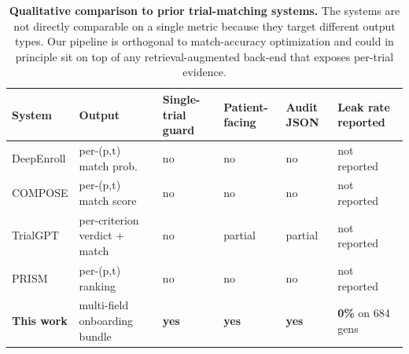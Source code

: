 \documentclass[11pt]{article}
\begin{document}
\begin{table}[!htbp]
\centering
\caption{\textbf{Qualitative comparison to prior trial-matching systems.} The systems are not directly comparable on a single metric because they target different output types. Our pipeline is orthogonal to match-accuracy optimization and could in principle sit on top of any retrieval-augmented back-end that exposes per-trial evidence.}
\label{tab:prior_systems}
\small
\setlength{\tabcolsep}{4pt}
\begin{tabularx}{\linewidth}{l X X X X X}
\toprule
System & Output & Single-trial guard & Patient-facing & Audit JSON & Leak rate reported \\
\midrule
DeepEnroll \citep{zhang2020deepenroll}  & per-(p,t) match prob.  & no  & no  & no  & not reported \\
COMPOSE \citep{gao2020compose}         & per-(p,t) match score   & no  & no  & no  & not reported \\
TrialGPT \citep{jin2024trialgpt}       & per-criterion verdict + match & no & partial & partial & not reported \\
PRISM \citep{gupta2024prism}           & per-(p,t) ranking       & no  & no  & no  & not reported \\
\textbf{This work}                      & multi-field onboarding bundle & \textbf{yes} & \textbf{yes} & \textbf{yes} & \textbf{0\%} on 684 gens \\
\bottomrule
\end{tabularx}
\end{table}
\end{document}
